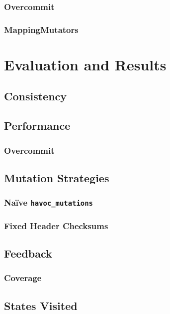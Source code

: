 \documentclass{article}
\begin{document}
\begin{multicols}{2}
  \subsubsection{Overcommit}
  \subsubsection{MappingMutators}

  \section{Evaluation and Results}


  \subsection{Consistency}
  \subsection{Performance}

  \subsubsection{Overcommit}

  \subsection{Mutation Strategies}

  \subsubsection{Naïve \texttt{havoc\_mutations}}

  \subsubsection{Fixed Header Checksums}

  \subsection{Feedback}

  \subsubsection{Coverage}

  \subsection{States Visited}


\end{multicols}
\end{document}
